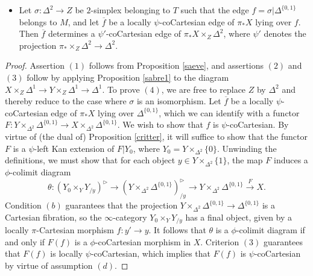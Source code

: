 \begin{corollary}
\begin{itemize}
\begin{itemize}
\item[$(\ast)$] For every locally $\pi$-Cartesian edge $\widetilde{f}$ of $Y$ lying over $f$, the image
$F( \widetilde{f} )$ is a locally $\phi$-coCartesian edge of $X$.
\end{itemize}
\item[$(4)$] Let $\sigma: \Delta^2 \rightarrow Z$ be $2$-simplex belonging to $T$ such
that the edge $f = \sigma| \Delta^{ \{0,1\} }$ belongs to $M$, and 
let $\overline{f}$ be a locally $\psi$-coCartesian edge of $\pi_{\ast} X$ lying over
$f$. Then $\overline{f}$ determines a
$\psi'$-coCartesian edge of $\pi_{\ast} X \times_{ Z} \Delta^2$, where
$\psi'$ denotes the projection $\pi_{\ast} \times_{Z} \Delta^2 \rightarrow \Delta^2$.
\end{itemize}
\end{corollary}

\begin{proof}
Assertion $(1)$ follows from Proposition \ref{saeve}, and assertions $(2)$ and $(3)$
follow by applying Proposition \ref{sabre1} to the diagram
$X \times_{Z} \Delta^1 \rightarrow Y \times_{Z} \Delta^1 \rightarrow \Delta^1$.
To prove $(4)$, we are free to replace $Z$ by $\Delta^2$ and thereby reduce to the
case where $\sigma$ is an isomorphism. Let $\overline{f}$ be a locally
$\psi$-coCartesian edge of $\pi_{\ast} X$ lying over $\Delta^{ \{0,1\} }$, which
we can identify with a functor $F: Y \times_{ \Delta^2} \Delta^{ \{0,1\} }
\rightarrow X \times_{ \Delta^2} \Delta^{ \{0,1\} }$. We wish to show that $f$ is $\psi$-coCartesian.
By virtue of (the dual of) Proposition \ref{critter}, it will suffice to show that
the functor $F$ is a $\psi$-left Kan extension of $F|Y_0$, where
$Y_0 = Y \times_{ \Delta^2} \{0\}$. Unwinding the definitions, we must show that for
each object $y \in Y \times_{ \Delta^2} \{1\}$, the map $F$ induces a $\phi$-colimit
diagram
$$ \theta: (Y_0 \times_{Y} Y_{/y})^{\triangleright} \rightarrow (Y \times_{\Delta^2} \Delta^{ \{0,1\}})_{/y}^{\triangleright} \rightarrow Y \times_{ \Delta^2} \Delta^{ \{0,1\} } \stackrel{F}{\rightarrow} X.$$
Condition $(b)$ guarantees that the projection $Y \times_{ \Delta^2} \Delta^{ \{0,1\} } \rightarrow \Delta^{ \{0,1\} }$ is a Cartesian fibration, so the $\infty$-category
$Y_0 \times_{Y} Y_{/y}$ has a final object, given by a locally $\pi$-Cartesian morphism
$f: y' \rightarrow y$. It follows that $\theta$ is a $\phi$-colimit diagram if and only if
$F(f)$ is a $\phi$-coCartesian morphism in $X$. Criterion $(3)$ guarantees that
$F(f)$ is locally $\psi$-coCartesian, which implies that $F(f)$ is $\psi$-coCartesian by virtue of assumption $(d)$.
\end{proof}

